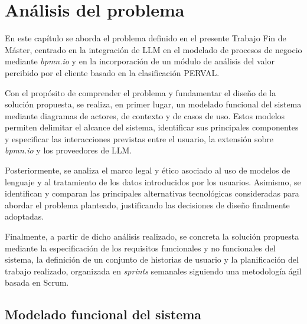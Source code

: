 

\chapter{Análisis del problema}
\label{cap:analisisProblema}

\shorthandoff{<>}

En este capítulo se aborda el  problema  definido en el presente  Trabajo Fin de Máster, centrado en la integración de LLM en el modelado de procesos de negocio mediante \textit{bpmn.io} y en la incorporación de un módulo de análisis del valor percibido por el cliente basado en la clasificación PERVAL.

 Con el propósito de comprender el problema y fundamentar el diseño de la solución propuesta, se realiza, en primer lugar,   un modelado funcional del sistema mediante diagramas de actores, de contexto y de casos de uso. Estos modelos permiten delimitar el alcance del sistema, identificar sus principales componentes y especificar  las interacciones previstas entre el usuario, la extensión sobre \textit{bpmn.io} y los proveedores de LLM. 

Posteriormente, se  analiza el marco legal y ético asociado al uso de modelos de lenguaje y al tratamiento de los datos introducidos por  los usuarios. Asimismo,  se  identifican y comparan las principales alternativas tecnológicas consideradas para abordar el problema  planteado, justificando las decisiones  de diseño finalmente adoptadas. 


 Finalmente, a partir de dicho análisis realizado, se concreta la solución propuesta mediante la especificación de los requisitos funcionales y no funcionales del sistema, la definición de  un conjunto de historias de usuario y la planificación del trabajo realizado, organizada en \textit{sprints} semanales siguiendo una metodología ágil  basada en Scrum.

\section{Modelado funcional del sistema}
\label{sec:modeladoFuncional}

